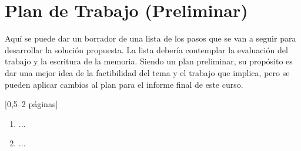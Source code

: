 \documentclass[guia]{upropuesta}
\begin{document}
\section{Plan de Trabajo (Preliminar)}\label{sec:pdt}

\begin{pauta}
Aquí se puede dar un borrador de una lista de los pasos que se van a seguir para desarrollar la solución propuesta. La lista debería contemplar la evaluación del trabajo y la escritura de la memoria. Siendo un plan preliminar, su propósito es dar una mejor idea de la factibilidad del tema y el trabajo que implica, pero se pueden aplicar cambios al plan para el informe final de este curso.

[0,5--2 páginas]
\end{pauta}

\begin{enumerate}
  \item ...
  \item ...
\end{enumerate}



\end{document}
